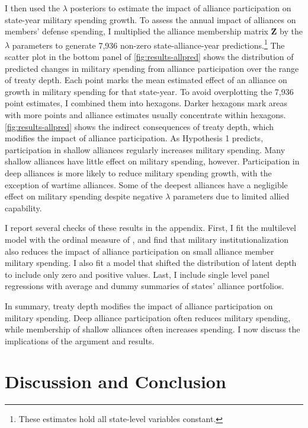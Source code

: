 \documentclass[12pt]{article}
\begin{document}
I then used the $\lambda$ posteriors to estimate the impact of alliance participation on state-year military spending growth. 
To assess the annual impact of alliances on members' defense spending, I multiplied the alliance membership matrix $\textbf{Z}$ by the $\lambda$ parameters to generate 7,936 non-zero state-alliance-year predictions.\footnote{These estimates hold all state-level variables constant.} 
The scatter plot in the bottom panel of \autoref{fig:results-allpred} shows the distribution of predicted changes in military spending from alliance participation over the range of treaty depth.
Each point marks the mean estimated effect of an alliance on growth in military spending for that state-year.
To avoid overplotting the 7,936 point estimates, I combined them into hexagons. 
Darker hexagons mark areas with more points and alliance estimates usually concentrate within hexagons. 
\autoref{fig:results-allpred} shows the indirect consequences of treaty depth, which modifies the impact of alliance participation. 
As Hypothesis 1 predicts, participation in shallow alliances regularly increases military spending. 
Many shallow alliances have little effect on military spending, however. 
Participation in deep alliances is more likely to reduce military spending growth, with the exception of wartime alliances. 
Some of the deepest alliances have a negligible effect on military spending despite negative $\lambda$ parameters due to limited allied capability. 


I report several checks of these results in the appendix.
First, I fit the multilevel model with the ordinal measure of \citep{LeedsAnac2005}, and find that military institutionalization also reduces the impact of alliance participation on small alliance member military spending. 
I also fit a model that shifted the distribution of latent depth to include only zero and positive values. 
Last, I include single level panel regressions with average and dummy summaries of states' alliance portfolios. 


In summary, treaty depth modifies the impact of alliance participation on military spending.  
Deep alliance participation often reduces military spending, while membership of shallow alliances often increases spending. 
I now discuss the implications of the argument and results. 



\section{Discussion and Conclusion}
\end{document}
